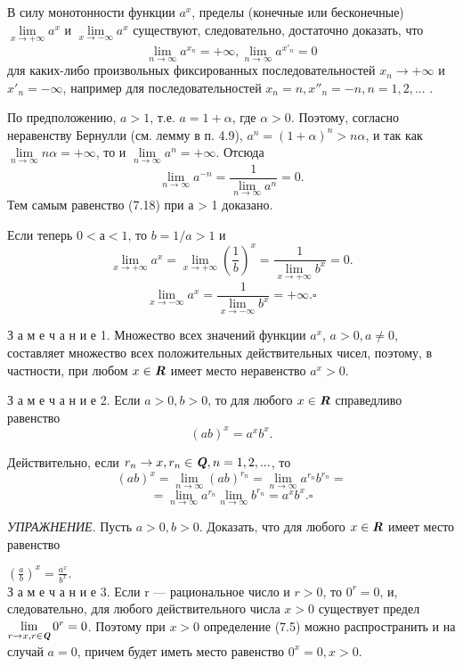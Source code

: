 \documentclass{article}
\begin{document}
В силу монотонности функции \(a^x\), пределы (конечные
или бесконечные) \(\lim\limits_{x\to +\infty} a^x\) и \(\lim\limits_{x\to -\infty} a^x\) существуют, следовательно, достаточно доказать, что
\[\lim\limits_{n\to \infty} a^{x_n} = +\infty, \lim\limits_{n\to \infty} a^{x'_n} = 0\]
для каких-либо произвольных фиксированных последовательностей \(x_n \to +\infty\) и \(x'_n = -\infty\), например для последовательностей \(x_n = n, x''_n = -n, n = 1, 2, ...\) .

По предположению, \(a > 1\), т.е.  \(a = 1 + \alpha\), где \(\alpha > 0\). Поэтому, согласно неравенству Бернулли (см. лемму в п. 4.9),
\(a^n = (1 + \alpha)^n > n\alpha\), и так как \(\lim\limits_{n\to \infty} n\alpha = +\infty\), то и
\(\lim\limits_{n\to \infty} a^n = +\infty\). Отсюда
\[\lim\limits_{n\to \infty} a^{-n} = \frac{1}{\lim\limits_{n\to \infty} a^n} = 0.\]
Тем самым равенство (7.18) при а > 1 доказано.

Если теперь \(0 < а < 1\), то \(b = 1/a > 1\) и
\[\lim\limits_{x\to +\infty} a^x = \lim\limits_{x\to +\infty} \left(\frac{1}{b}\right)^x = \frac{1}{\lim\limits_{x\to +\infty} b^x} = 0.\]
\[\lim\limits_{x\to -\infty} a^x = \frac{1}{\lim\limits_{x\to -\infty} b^x} = +\infty. \square\]

З а м е ч а н и е 1. Множество всех значений функции \(a^x\),
\(a>0, a \neq 0\), составляет множество всех положительных действительных чисел, поэтому, в частности, при любом \(x \in \textbf{\textit{R}}\)
имеет место неравенство \(a^x > 0\).

З а м е ч а н и е 2. Если \(a > 0, b > 0\), то для любого \(x \in \textbf{\textit{R}}\)
справедливо равенство
\[(ab)^x = a^x b^x.\]

Действительно, если \(r_n \to x, r_n \in \textbf{\textit{Q}}, n = 1, 2, ...\), то
\[(ab)^x = \lim\limits_{n\to \infty} (ab)^{r_n} = \lim\limits_{n\to \infty} a^{r_n} b^{r_n} = \]
\[ = \lim\limits_{n\to \infty} a^{r_n} \lim\limits_{n\to \infty} b^{r_n} = a^x b^x . \square \]
\newpage
\noindent
\begin{footnotesize}
\textit{УПРАЖНЕНИЕ}. Пусть \(a > 0, b> 0\). Доказать, что для любого \(x \in \textbf{\textit{R}}\) имеет место равенство \end{footnotesize} \(\left(\frac{a}{b}\right)^x = \frac{a^x}{b^x}.\) \\

З а м е ч а н и е 3. Если r — рациональное число и \(r > 0\),
то \(0^r = 0\), и, следовательно, для любого действительного числа
\(x > 0\) существует предел \(\lim\limits_{r\to x, r \in \textbf{\textit{Q}}} 0^r = 0\). Поэтому при \(x > 0\)
определение (7.5) можно распространить и на случай \(a = 0\),
причем будет иметь место равенство \(0^x = 0, x > 0\).
\end{document}
